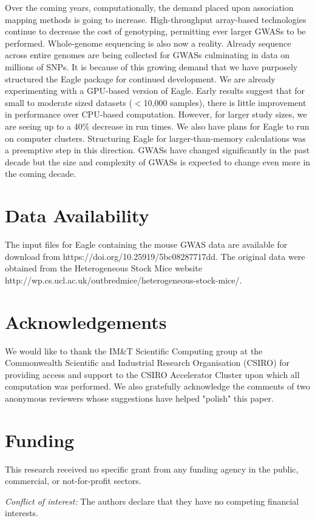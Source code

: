 \documentclass{article}
\begin{document}
Over the coming years, computationally, the demand placed upon association mapping methods is going to increase. 
High-throughput array-based technologies continue to decrease the cost of genotyping, permitting ever larger GWASs to be performed. 
Whole-genome sequencing is also now a reality. Already sequence across entire genomes are being collected for GWASs \citep{gudbjartsson2015large, long2017whole}
culminating in data on millions of SNPs. It is because of this growing demand that 
we have purposely structured the Eagle package for continued development. We are already experimenting with a GPU-based version of Eagle. 
Early results suggest that for small to moderate sized datasets ($<$10,000 samples), there is little improvement in performance over CPU-based 
computation.  However, for larger study sizes, we are seeing up to a 40\% decrease in run times.  
We also have plans for Eagle to run on computer clusters. Structuring Eagle for larger-than-memory calculations was a 
preemptive step in this direction. GWASs have changed significantly in the past decade but the size and complexity of GWASs is expected 
to change even more in the coming decade. 





\section*{Data Availability}
The input files for Eagle containing the mouse GWAS data are available for download from 
https://doi.org/10.25919/5bc08287717dd. The original data were obtained from the Heterogeneous Stock Mice website 
http://wp.cs.ucl.ac.uk/outbredmice/heterogeneous-stock-mice/.  



\section*{Acknowledgements}
We would like to thank the IM\&T Scientific Computing group at the Commonwealth Scientific and Industrial Research Organisation (CSIRO) for providing access and support to the CSIRO Accelerator Cluster upon which all computation was performed. 
We also gratefully acknowledge the comments of two anonymous reviewers whose suggestions have helped "polish" this paper. 


\section*{Funding}
This research received no specific grant from any funding agency in the public, commercial, or not-for-profit sectors.

\vspace{1cm}
\noindent
{\em Conflict of interest:} The authors declare that they have no
competing financial interests.





  
 



\end{document}
